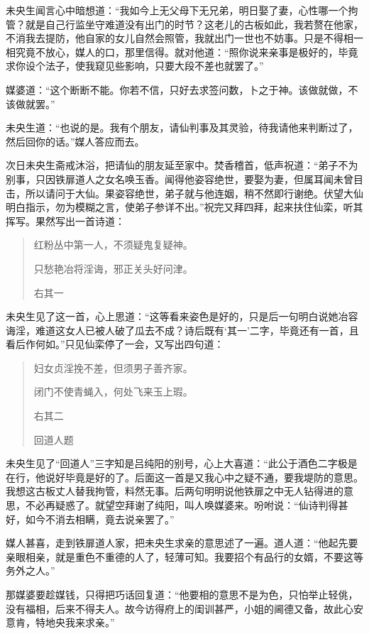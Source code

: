 \documentclass[a4paper,12pt,UTF8,twoside]{ctexbook}
\begin{document}
未央生闻言心中暗想道：“我如今上无父母下无兄弟，明日娶了妻，心性哪一个拘管？就是自己行监坐守难道没有出门的时节？这老儿的古板如此，我若赘在他家，不消我去提防，他自家的女儿自然会照管，我就出门一世也不妨事。只是不得相一相究竟不放心，媒人的口，那里信得。就对他道：“照你说来亲事是极好的，毕竟求你设个法子，使我窥见些影响，只要大段不差也就罢了。”

媒婆道：“这个断断不能。你若不信，只好去求签问数，卜之于神。该做就做，不该做就罢。”

未央生道：“也说的是。我有个朋友，请仙判事及其灵验，待我请他来判断过了，然后回你的话。”媒人答应而去。

次日未央生斋戒沐浴，把请仙的朋友延至家中。焚香稽首，低声祝道：“弟子不为别事，只因铁扉道人之女名唤玉香。闻得他姿容绝世，要娶为妻，但属耳闻未曾目击，所以请问于大仙。果姿容绝世，弟子就与他连姻，稍不然即行谢绝。伏望大仙明白指示，勿为模糊之言，使弟子参详不出。”祝完又拜四拜，起来扶住仙栾，听其挥写。果然写出一首诗道：

\begin{quotation}
红粉丛中第一人，不须疑鬼复疑神。

只愁艳冶将淫诲，邪正关头好问津。

右其一
\end{quotation}

未央生见了这一首，心上思道：“这等看来姿色是好的，只是后一句明白说她冶容诲淫，难道这女人已被人破了瓜去不成？诗后既有‘其一’二字，毕竟还有一首，且看后作何如。”只见仙栾停了一会，又写出四句道：

\begin{quotation}
妇女贞淫挽不差，但须男子善齐家。

闭门不使青蝇入，何处飞来玉上瑕。

右其二

回道人题
\end{quotation}

未央生见了“回道人”三字知是吕纯阳的别号，心上大喜道：“此公于酒色二字极是在行，他说好毕竟是好的了。后面这一首是又我心中之疑不通，要我堤防的意思。我想这古板丈人替我拘管，料然无事。后两句明明说他铁扉之中无人钻得进的意思，不必再疑惑了。就望空拜谢了纯阳，叫人唤媒婆来。吩咐说：“仙诗判得甚好，如今不消去相瞒，竟去说亲罢了。”

媒人甚喜，走到铁扉道人家，把未央生求亲的意思述了一遍。道人道：“他起先要亲眼相亲，就是重色不重德的人了，轻薄可知。我要招个有品行的女婿，不要这等务外之人。”

那媒婆要趁媒钱，只得把巧话回复道：“他要相的意思不是为色，只怕举止轻佻，没有福相，后来不得夫人。故今访得府上的闺训甚严，小姐的阃德又备，故此心安意肯，特地央我来求亲。”
\end{document}

